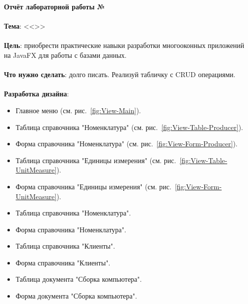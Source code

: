 \documentclass[12pt, a4paper, simple]{eskdtext}
\def \gpiDocTopic {Отчёт лабораторной работы №\gpiDocNum}
\begin{document}
    
    \begin{center}
        \textbf{\gpiDocTopic}
    \end{center}

    \paragraph{} \textbf{Тема}: <<\gpiTopicRep>>

    \paragraph{} \textbf{Цель}:
    приобрести практические навыки разработки многооконных приложений на JavaFX для работы с базами данных.

    \paragraph{} \textbf{Что нужно сделать}:
    долго писать.
    Реализуй табличку с CRUD операциями.

    \paragraph{} \textbf{Разработка дизайна}:

    \begin{itemize}
        \item Главное меню (см. рис.~\ref{fig:View-Main}).
        \item Таблица справочника "Номенклатура" (см. рис.~\ref{fig:View-Table-Producer}).
        \item Форма справочника "Номенклатура" (см. рис.~\ref{fig:View-Form-Producer}).
        \item Таблица справочника "Единицы измерения" (см. рис.~\ref{fig:View-Table-UnitMeasure}).
        \item Форма справочника "Единицы измерения" (см. рис.~\ref{fig:View-Form-UnitMeasure}).
        \item Таблица справочника "Номенклатура".
        \item Форма справочника "Номенклатура".
        \item Таблица справочника "Клиенты".
        \item Форма справочника "Клиенты".
        \item Таблица документа "Сборка компьютера".
        \item Форма документа "Сборка компьютера".
    \end{itemize}
\end{document}
